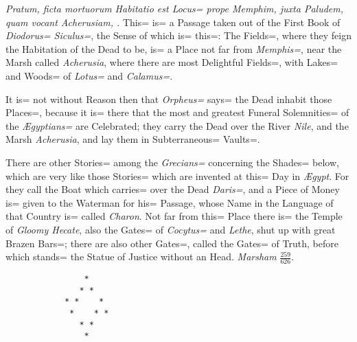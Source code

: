 \emph{Pratum, ficta mortuorum Habitatio est Locus= prope Memphim,
juxta Paludem, quam vocant Acherusiam, \etc.}
This= is= a Passage taken out of the First Book of \emph{Diodorus= Siculus=},
the Sense of which is= this=:
The Fields=, where they feign the Habitation of the Dead to be,
is= a Place not far from \emph{Memphis=},
near the Marsh called \emph{Acherusia},
where there are most Delightful Fields=,
with Lakes= and Woods= of \emph{Lotus=} and \emph{Calamus=}.

It is= not without Reason then that \emph{Orpheus=} says= the Dead inhabit those Places=,
because it is= there that the most and greatest Funeral Solemnities= of the \emph{\AE gyptians=} are Celebrated;
they carry the Dead over the River \emph{Nile},
and the Marsh \emph{Acherusia},
and lay them in Subterraneous= Vaults=.

There are other Stories= among the \emph{Grecians=} concerning the Shades= below,
which are very like those Stories= which are invented at this= Day in \emph{\AE gypt}.
For they call the Boat which carries= over the Dead \emph{Daris=},
and a Piece of Money is= given to the Waterman for his= Passage,
whose Name in the Language of that Country is= called \emph{Charon}.
Not far from this= Place there is= the Temple of \emph{Gloomy Hecate},
also the Gates= of \emph{Cocytus=} and \emph{Lethe},
shut up with great Brazen Bars=;
there are also other Gates=,
called the Gates= of Truth,
before which stands= the Statue of Justice without an Head.
\emph{Marsham} {\tiny $\displaystyle\frac{259}{626}$}.

\vfill
\begin{verbatim}
                *
               * *
            * *    *
             *    * *
               * *
                *
\end{verbatim}
\vfill
\fancyhead[LE]{}
\fancyfoot{}

